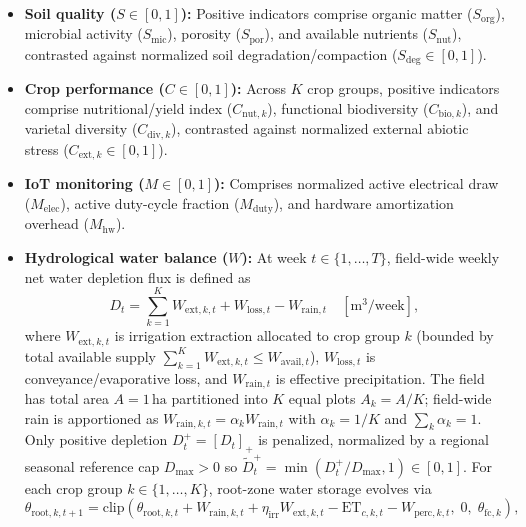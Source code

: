 \documentclass[11pt,a4paper]{article}
\newcommand{\pos}[1]{\left[#1\right]_{+}}
\begin{document}
\begin{itemize}
  \item \textbf{Soil quality ($S \in [0,1]$):} Positive indicators comprise organic matter ($S_{\mathrm{org}}$), microbial activity ($S_{\mathrm{mic}}$), porosity ($S_{\mathrm{por}}$), and available nutrients ($S_{\mathrm{nut}}$), contrasted against normalized soil degradation/compaction ($S_{\mathrm{deg}} \in [0,1]$).
  \item \textbf{Crop performance ($C \in [0,1]$):} Across $K$ crop groups, positive indicators comprise nutritional/yield index ($C_{\mathrm{nut},k}$), functional biodiversity ($C_{\mathrm{bio},k}$), and varietal diversity ($C_{\mathrm{div},k}$), contrasted against normalized external abiotic stress ($C_{\mathrm{ext},k} \in [0,1]$).
  \item \textbf{IoT monitoring ($M \in [0,1]$):} Comprises normalized active electrical draw ($M_{\mathrm{elec}}$), active duty-cycle fraction ($M_{\mathrm{duty}}$), and hardware amortization overhead ($M_{\mathrm{hw}}$).
  \item \textbf{Hydrological water balance ($W$):} At week $t \in \{1,\dots,T\}$, field-wide weekly net water depletion flux is defined as
  \begin{equation}
    D_t = \sum_{k=1}^{K} W_{\mathrm{ext},k,t} + W_{\mathrm{loss},t} - W_{\mathrm{rain},t} \quad [\mathrm{m}^3/\text{week}],
  \end{equation}
  where $W_{\mathrm{ext},k,t}$ is irrigation extraction allocated to crop group $k$ (bounded by total available supply $\sum_{k=1}^K W_{\mathrm{ext},k,t} \le W_{\mathrm{avail},t}$), $W_{\mathrm{loss},t}$ is conveyance/evaporative loss, and $W_{\mathrm{rain},t}$ is effective precipitation. The field has total area $A = 1\,\mathrm{ha}$ partitioned into $K$ equal plots $A_k = A/K$; field-wide rain is apportioned as $W_{\mathrm{rain},k,t} = \alpha_k W_{\mathrm{rain},t}$ with $\alpha_k = 1/K$ and $\sum_k \alpha_k = 1$. Only positive depletion $D_t^+ = \pos{D_t}$ is penalized, normalized by a regional seasonal reference cap $D_{\max} > 0$ so $\tilde{D}_t^+ = \min(D_t^+ / D_{\max}, 1) \in [0,1]$. For each crop group $k \in \{1,\dots,K\}$, root-zone water storage evolves via
  \begin{equation}
    \theta_{\mathrm{root},k,t+1} = \mathrm{clip}\!\left(\theta_{\mathrm{root},k,t} + W_{\mathrm{rain},k,t} + \eta_{\mathrm{irr}} W_{\mathrm{ext},k,t} - \mathrm{ET}_{c,k,t} - W_{\mathrm{perc},k,t},\; 0,\; \theta_{\mathrm{fc},k}\right),
  \end{equation}

\end{itemize}
\end{document}
